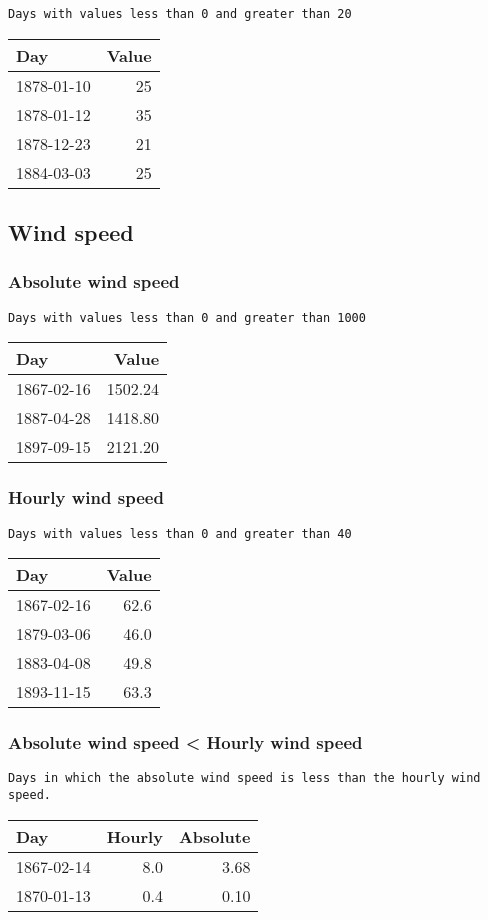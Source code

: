 \documentclass[]{article}
\begin{document}
\begin{verbatim}
Days with values less than 0 and greater than 20
\end{verbatim}

\begin{longtable}[]{@{}lr@{}}
\toprule
Day & Value\tabularnewline
\midrule
\endhead
1878-01-10 & 25\tabularnewline
1878-01-12 & 35\tabularnewline
1878-12-23 & 21\tabularnewline
1884-03-03 & 25\tabularnewline
\bottomrule
\end{longtable}

\subsection{Wind speed}\label{wind-speed}

\subsubsection{Absolute wind speed}\label{absolute-wind-speed-1}

\begin{verbatim}
Days with values less than 0 and greater than 1000
\end{verbatim}

\begin{longtable}[]{@{}lr@{}}
\toprule
Day & Value\tabularnewline
\midrule
\endhead
1867-02-16 & 1502.24\tabularnewline
1887-04-28 & 1418.80\tabularnewline
1897-09-15 & 2121.20\tabularnewline
\bottomrule
\end{longtable}

\subsubsection{Hourly wind speed}\label{hourly-wind-speed}

\begin{verbatim}
Days with values less than 0 and greater than 40
\end{verbatim}

\begin{longtable}[]{@{}lr@{}}
\toprule
Day & Value\tabularnewline
\midrule
\endhead
1867-02-16 & 62.6\tabularnewline
1879-03-06 & 46.0\tabularnewline
1883-04-08 & 49.8\tabularnewline
1893-11-15 & 63.3\tabularnewline
\bottomrule
\end{longtable}

\subsubsection{Absolute wind speed \textless{} Hourly wind
speed}\label{absolute-wind-speed-hourly-wind-speed}

\begin{verbatim}
Days in which the absolute wind speed is less than the hourly wind speed.
\end{verbatim}

\begin{longtable}[]{@{}lrr@{}}
\toprule
Day & Hourly & Absolute\tabularnewline
\midrule
\endhead
1867-02-14 & 8.0 & 3.68\tabularnewline
1870-01-13 & 0.4 & 0.10\tabularnewline
\bottomrule
\end{longtable}
\end{document}
